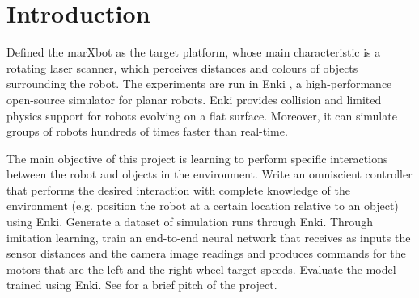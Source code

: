 \section{Introduction}
Defined the marXbot \cite{bonani2010marxbot} as the target platform, whose main characteristic is a rotating laser 
scanner, which perceives distances and colours of objects surrounding the robot. The experiments are run in Enki  
\cite{enki}, a high-performance open-source simulator for planar robots. Enki provides collision and limited physics 
support for robots evolving on a flat surface. 
Moreover, it can simulate groups of robots hundreds of times faster than real-time.

The main objective of this project is learning to perform specific interactions between the robot and objects in the 
environment.
Write an omniscient controller that performs the desired interaction with complete knowledge of the environment (e.g. 
position the robot at a certain location relative to an object) using Enki.
Generate a dataset of simulation runs through Enki. 
Through imitation learning, train an end-to-end neural network that receives as inputs the sensor distances and the 
camera image readings and produces commands for the motors that are the left and the right wheel target speeds.
Evaluate the model trained using Enki.
See \cite{pitch} for a brief pitch of the project. 
